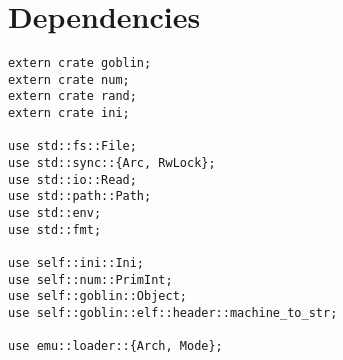 \documentclass[11pt]{article}
\begin{document}
\section{Dependencies}
\label{sec:org3fde841}

\lstset{language=rust,label=orga1fea7a,caption= ,captionpos=b,numbers=none}
\begin{lstlisting}
extern crate goblin;
extern crate num;
extern crate rand;
extern crate ini;

use std::fs::File;
use std::sync::{Arc, RwLock};
use std::io::Read;
use std::path::Path;
use std::env;
use std::fmt;

use self::ini::Ini;
use self::num::PrimInt;
use self::goblin::Object;
use self::goblin::elf::header::machine_to_str;

use emu::loader::{Arch, Mode};
\end{lstlisting}
\end{document}
